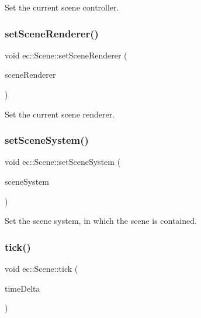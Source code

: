 Set the current scene controller. 

\mbox{\label{classec_1_1_scene_a4a000b3820dfcf578ed80bae3bf5f432}} 
\subsubsection{\texorpdfstring{set\+Scene\+Renderer()}{setSceneRenderer()}}
{\footnotesize\ttfamily void ec\+::\+Scene\+::set\+Scene\+Renderer (\begin{DoxyParamCaption}\item[{const \mbox{\hyperlink{classec_1_1_scene_renderer}{Scene\+Renderer}} \&}]{scene\+Renderer }\end{DoxyParamCaption})}



Set the current scene renderer. 

\mbox{\label{classec_1_1_scene_a87a6277fea206956c0a7175cf308ece0}} 
\subsubsection{\texorpdfstring{set\+Scene\+System()}{setSceneSystem()}}
{\footnotesize\ttfamily void ec\+::\+Scene\+::set\+Scene\+System (\begin{DoxyParamCaption}\item[{\mbox{\hyperlink{classec_1_1_scene_system}{Scene\+System}} $\ast$}]{scene\+System }\end{DoxyParamCaption})}



Set the scene system, in which the scene is contained. 

\mbox{\label{classec_1_1_scene_a09deb945a2c8255d70a68b0aaddaecb6}} 
\subsubsection{\texorpdfstring{tick()}{tick()}}
{\footnotesize\ttfamily void ec\+::\+Scene\+::tick (\begin{DoxyParamCaption}\item[{float}]{time\+Delta }\end{DoxyParamCaption})\hspace{0.3cm}{\ttfamily [virtual]}}



